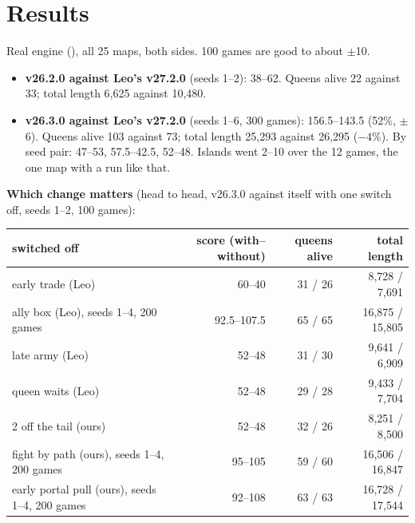 \documentclass[11pt,a4paper]{article}
\newcommand{\code}[1]{\texttt{\detokenize{#1}}}
\begin{document}
\section{Results}\label{sec:mergeresults}
Real engine (\code{ubcrun}), all 25 maps, both sides. 100 games are good to about $\pm$10.
\begin{itemize}
      \item \textbf{v26.2.0 against Leo's v27.2.0} (seeds 1--2): 38--62. Queens alive 22 against 33; total length 6,625 against
            10,480.
      \item \textbf{v26.3.0 against Leo's v27.2.0} (seeds 1--6, 300 games): 156.5--143.5 (52\%, $\pm$6). Queens alive 103
            against 73; total length 25,293 against 26,295 ($-4\%$). By seed pair: 47--53, 57.5--42.5, 52--48. Islands went
            2--10 over the 12 games, the one map with a run like that.
\end{itemize}
\textbf{Which change matters} (head to head, v26.3.0 against itself with one switch off, seeds 1--2, 100 games):
\begin{center}
      \begin{tabular}{lrrr}
            switched off                                    & score (with--without) & queens alive & total length    \\ \hline
            early trade (Leo)                               & 60--40                & 31 / 26      & 8,728 / 7,691   \\
            ally box (Leo), seeds 1--4, 200 games           & 92.5--107.5           & 65 / 65      & 16,875 / 15,805 \\
            late army (Leo)                                 & 52--48                & 31 / 30      & 9,641 / 6,909   \\
            queen waits (Leo)                               & 52--48                & 29 / 28      & 9,433 / 7,704   \\
            2 off the tail (ours)                           & 52--48                & 32 / 26      & 8,251 / 8,500   \\
            fight by path (ours), seeds 1--4, 200 games     & 95--105               & 59 / 60      & 16,506 / 16,847 \\
            early portal pull (ours), seeds 1--4, 200 games & 92--108               & 63 / 63      & 16,728 / 17,544 \\
      \end{tabular}
\end{center}
\end{document}
